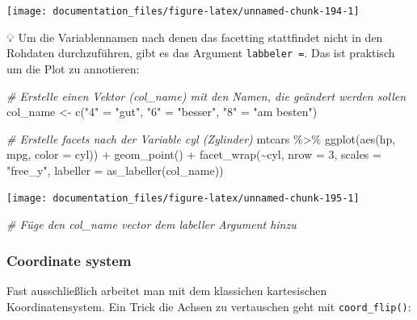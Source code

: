 \documentclass[
]{article}
\newenvironment{Shaded}{\begin{snugshade}}{\end{snugshade}}
\newcommand{\AttributeTok}[1]{\textcolor[rgb]{0.77,0.63,0.00}{#1}}
\newcommand{\CommentTok}[1]{\textcolor[rgb]{0.56,0.35,0.01}{\textit{#1}}}
\newcommand{\DecValTok}[1]{\textcolor[rgb]{0.00,0.00,0.81}{#1}}
\newcommand{\FunctionTok}[1]{\textcolor[rgb]{0.00,0.00,0.00}{#1}}
\newcommand{\NormalTok}[1]{#1}
\newcommand{\OtherTok}[1]{\textcolor[rgb]{0.56,0.35,0.01}{#1}}
\newcommand{\SpecialCharTok}[1]{\textcolor[rgb]{0.00,0.00,0.00}{#1}}
\newcommand{\StringTok}[1]{\textcolor[rgb]{0.31,0.60,0.02}{#1}}
\begin{document}
\begin{center}\texttt{[image: documentation\_files/figure-latex/unnamed-chunk-194-1]} \end{center}

💡 Um die Variablennamen nach denen das facetting stattfindet nicht in den Rohdaten durchzuführen, gibt es das Argument \texttt{labbeler\ =}. Das ist praktisch um die Plot zu annotieren:

\begin{Shaded}
\begin{Highlighting}[]
\CommentTok{\# Erstelle einen Vektor (col\_name) mit den Namen, die geändert werden sollen}
\NormalTok{col\_name }\OtherTok{\textless{}{-}} \FunctionTok{c}\NormalTok{(}\StringTok{"4"} \OtherTok{=} \StringTok{"gut"}\NormalTok{, }\StringTok{"6"} \OtherTok{=} \StringTok{"besser"}\NormalTok{, }\StringTok{"8"} \OtherTok{=} \StringTok{"am besten"}\NormalTok{)}

\CommentTok{\# Erstelle facets nach der Variable cyl (Zylinder)}
\NormalTok{mtcars }\SpecialCharTok{\%\textgreater{}\%}
  \FunctionTok{ggplot}\NormalTok{(}\FunctionTok{aes}\NormalTok{(hp, mpg, }\AttributeTok{color =}\NormalTok{ cyl)) }\SpecialCharTok{+}
  \FunctionTok{geom\_point}\NormalTok{() }\SpecialCharTok{+}
  \FunctionTok{facet\_wrap}\NormalTok{(}\SpecialCharTok{\textasciitilde{}}\NormalTok{cyl, }\AttributeTok{nrow =} \DecValTok{3}\NormalTok{, }\AttributeTok{scales =} \StringTok{"free\_y"}\NormalTok{, }\AttributeTok{labeller =} \FunctionTok{as\_labeller}\NormalTok{(col\_name)) }
\end{Highlighting}
\end{Shaded}

\begin{center}\texttt{[image: documentation\_files/figure-latex/unnamed-chunk-195-1]} \end{center}

\begin{Shaded}
\begin{Highlighting}[]
\CommentTok{\# Füge den col\_name vector dem labeller Argument hinzu}
\end{Highlighting}
\end{Shaded}

\hypertarget{coordinate-system}{%
\subsubsection{Coordinate system}\label{coordinate-system}}

Fast ausschließlich arbeitet man mit dem klassichen kartesischen Koordinatensystem. Ein Trick die Achsen zu vertauschen geht mit \texttt{coord\_flip()}:
\end{document}
